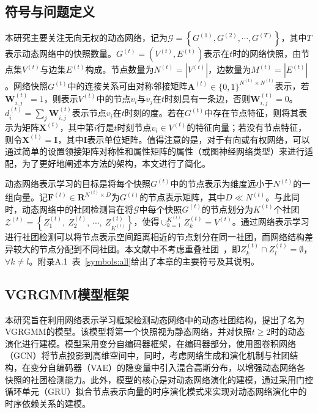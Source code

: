 \subsection{符号与问题定义}
本研究主要关注无向无权的动态网络，记为$\mathcal{G}=\left\{G^{(1)},G^{(2)},\cdots,G^{(T)}\right\}$，其中$T$表示动态网络中的快照数量。$G^{(t)} = (V^{(t)}, E^{(t)})$表示在$t$时的网络快照，由节点集$V^{(t)}$与边集$E^{(t)}$构成。节点数量为$N^{(t)} = |V^{(t)}|$，边数量为$M^{(t)} = |E^{(t)}|$。网络快照$G^{(t)}$中的连接关系可由对称邻接矩阵$\mathbf{A}^{(t)} \in \{0,1\}^{N^{(t)}\times N^{(t)}}$表示，若$\mathbf{W}_{i,j}^{(t)} = 1$，则表示$V^{(t)}$中的节点$v_i$与$v_j$在$t$时刻具有一条边，否则$\mathbf{W}_{i,j}^{(t)} = 0$。$d^{(t)}_i = \sum_{j}\mathbf{W}_{i,j}^{(t)}$表示节点$v_i$在$t$时刻的度。若在$G^{(t)}$中存在节点特征，则将其表示为矩阵$\mathbf{X}^{(t)}$，其中第$i$行是$t$时刻节点$v_i \in V^{(t)}$的特征向量；若没有节点特征，则令$\mathbf{X}^{(t)} = \mathbf{I}$，其中$\mathbf{I}$表示单位矩阵。值得注意的是，对于有向或有权网络，可以通过简单的设置领接矩阵对称性和属性矩阵的属性（或图神经网络类型）来进行适配，为了更好地阐述本方法的架构，本文进行了简化。

动态网络表示学习的目标是将每个快照$G^{(t)}$中的节点表示为维度远小于$N^{(t)}$的一组向量。记$\mathbf{F}^{(t)} \in \boldsymbol{R}^{N^{(t)}\times D}$为$G^{(t)}$的节点表示矩阵，其中$D \ll N^{(t)}$。与此同时，动态网络中的社团检测旨在将$\mathcal{G}$中每个快照$G^{(t)}$的节点划分为$K^{(t)}$个社团$\mathcal{Z}^{(t)} = \left\{Z_{1}^{(t)},\ Z_{2}^{(t)},\ \cdots,\ Z_{K^{(t)}}^{(t)} \right\}$，使得$\cup_{k=1}^{K^{(t)}} Z_{k}^{(t)} = V^{(t)}$。通过网络表示学习进行社团检测可以将节点表示空间距离相近的节点划分在同一社团，而网络结构差异较大的节点分配到不同社团。本文献中不考虑重叠社团~\cite{yang2014overlapping}，即$Z_{k}^{(t)} \cap Z_{l}^{(t)} = \emptyset$，$\forall k \neq l$。附录A.1~表~\ref{symbols:all}给出了本章的主要符号及其说明。

\subsection{VGRGMM模型框架}

本研究旨在利用网络表示学习框架检测动态网络中的动态社团结构，提出了名为VGRGMM的模型。该模型将第一个快照视为静态网络，并对快照$t \ge 2$时的动态演化进行建模。模型采用变分自编码器框架，在编码器部分，使用图卷积网络（GCN）\cite{Kipf.2017.Welling}将节点投影到高维空间中，同时，考虑网络生成和演化机制与社团结构，在变分自编码器（VAE）\cite{kingma2013auto}的隐变量中引入混合高斯分布，以增强动态网络各快照的社团检测能力。此外，模型的核心是对动态网络演化的建模，通过采用门控循环单元（GRU）拟合节点表示向量的时序演化模式来实现对动态网络演化中的时序依赖关系的建模。
 

